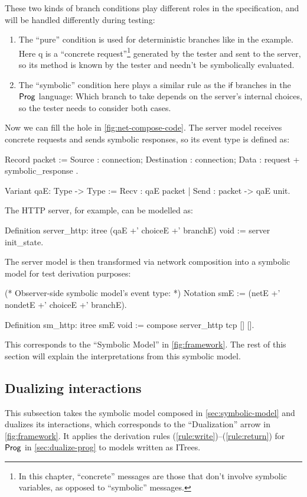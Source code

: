 These two kinds of branch conditions play different roles in the specification,
and will be handled differently during testing:
\begin{enumerate}
\item The ``pure''  condition is used for deterministic branches like
   in the example.  Here \ilc q is a ``concrete
  request''\footnote{In this chapter, ``concrete'' messages are those that don't
    involve symbolic variables, as opposed to ``symbolic'' messages.} generated
  by the tester and sent to the server, so its method is known by the tester and
  needn't be symbolically evaluated.
\item The ``symbolic''  condition here plays a similar rule as the
  $\mathsf{if}$ branches in the $\mathsf{Prog}$ language: Which branch to take depends
  on the server's internal choices, so the tester needs to consider both cases.
\end{enumerate}

Now we can fill the hole  in \autoref{fig:net-compose-code}.  The
server model receives concrete requests and sends symbolic responses, so its
event type is defined as:
\begin{coq}
  Record packet := {
    Source      : connection;
    Destination : connection;
    Data        : request + symbolic_response
  }.

  Variant qaE: Type -> Type :=
    Recv : qaE packet
  | Send : packet -> qaE unit.
\end{coq}

The HTTP server, for example, can be modelled as:
\begin{coq}
  Definition server_http: itree (qaE +' choiceE +' branchE) void :=
    server init_state.
\end{coq}

The server model is then transformed via network composition into a symbolic
model for test derivation purposes:
\begin{coq}
  (* Observer-side symbolic model's event type: *)
  Notation smE := (netE +' nondetE +' choiceE +' branchE).
  
  Definition sm_http: itree smE void :=
    compose server_http tcp [] [].
\end{coq}

This corresponds to the ``Symbolic Model'' in \autoref{fig:framework}.  The rest
of this section will explain the interpretations from this symbolic model.

\subsection{Dualizing interactions}
\label{sec:dualize-interaction}
This subsection takes the symbolic model composed in
\autoref{sec:symbolic-model} and dualizes its interactions, which corresponds to
the ``Dualization'' arrow in \autoref{fig:framework}.  It applies the derivation
rules (\ref{rule:write})--(\ref{rule:return}) for $\mathsf{Prog}$ in
\autoref{sec:dualize-prog} to models written as ITrees.

